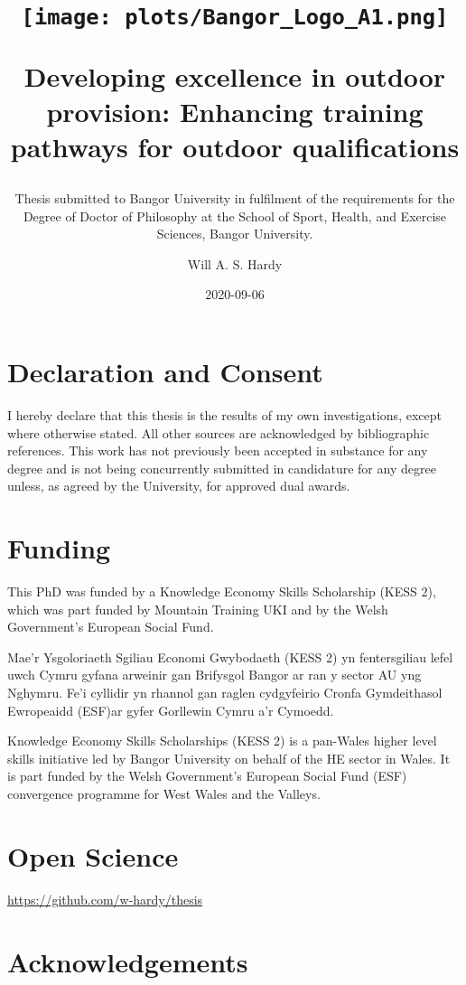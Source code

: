 \documentclass[
  12pt,
  a4paper,
]{book}
\title{\texttt{[image: plots/Bangor\_Logo\_A1.png]}

\textbf{Developing excellence in outdoor provision: Enhancing training pathways for outdoor qualifications}}
\subtitle{\hfill \break  Thesis submitted to Bangor University in fulfilment of the requirements for the Degree of Doctor of Philosophy at the School of Sport, Health, and Exercise Sciences, Bangor University.}
\author{Will A. S. Hardy}
\date{2020-09-06}
\begin{document}
\maketitle

\frontmatter

\section*{Declaration and Consent}

I hereby declare that this thesis is the results of my own investigations, except where otherwise stated. All other sources are acknowledged by bibliographic references. This work has not previously been accepted in substance for any degree and is not being concurrently submitted in candidature for any degree unless, as agreed by the University, for approved dual awards.

\section*{Funding}

This PhD was funded by a Knowledge Economy Skills Scholarship (KESS 2), which was part funded by Mountain Training UKI and by the Welsh Government's European Social Fund.

Mae’r Ysgoloriaeth Sgiliau Economi Gwybodaeth (KESS 2) yn fentersgiliau lefel uwch Cymru gyfana arweinir gan Brifysgol Bangor ar ran y sector AU yng Nghymru. Fe’i cyllidir yn rhannol gan raglen cydgyfeirio Cronfa Gymdeithasol Ewropeaidd (ESF)ar gyfer Gorllewin Cymru a’r Cymoedd.

Knowledge Economy Skills Scholarships (KESS 2) is a pan-Wales higher level skills initiative led by Bangor University on behalf of the HE sector in Wales. It is part funded by the Welsh Government’s European Social Fund (ESF) convergence programme for West Wales and the Valleys.

\section*{Open Science}

\url{https://github.com/w-hardy/thesis}

\section*{Acknowledgements}
\end{document}
